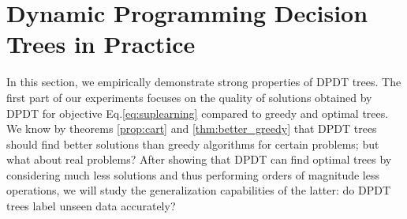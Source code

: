 \chapter{Dynamic Programming Decision Trees in Practice}\label{sec:exps-dt}

In this section, we empirically demonstrate strong properties of DPDT trees. 
The first part of our experiments focuses on the quality of solutions obtained by DPDT for objective Eq.\ref{eq:suplearning} compared to greedy and optimal trees. We know by theorems \ref{prop:cart} and \ref{thm:better_greedy} that DPDT trees should find better solutions than greedy algorithms for certain problems; but what about real problems?
After showing that DPDT can find optimal trees by considering much less solutions and thus performing orders of magnitude less operations, we will study the generalization capabilities of the latter: do DPDT trees label unseen data accurately?

